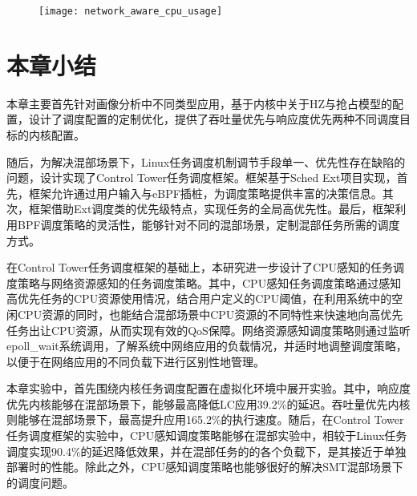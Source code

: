 \begin{figure}[H]
    \centering
    \texttt{[image: network\_aware\_cpu\_usage]}
    \label{fig:network_aware_cpu_usage}
\end{figure}


\section{本章小结}

本章主要首先针对画像分析中不同类型应用，基于内核中关于HZ与抢占模型的配置，设计了调度配置的定制优化，提供了吞吐量优先与响应度优先两种不同调度目标的内核配置。

随后，为解决混部场景下，Linux任务调度机制调节手段单一、优先性存在缺陷的问题，设计实现了Control Tower任务调度框架。框架基于Sched Ext项目实现，首先，框架允许通过用户输入与eBPF插桩，为调度策略提供丰富的决策信息。其次，框架借助Ext调度类的优先级特点，实现任务的全局高优先性。最后，框架利用BPF调度策略的灵活性，能够针对不同的混部场景，定制混部任务所需的调度方式。

在Control Tower任务调度框架的基础上，本研究进一步设计了CPU感知的任务调度策略与网络资源感知的任务调度策略。其中，CPU感知任务调度策略通过感知高优先任务的CPU资源使用情况，结合用户定义的CPU阈值，在利用系统中的空闲CPU资源的同时，也能结合混部场景中CPU资源的不同特性来快速地向高优先任务出让CPU资源，从而实现有效的QoS保障。网络资源感知调度策略则通过监听epoll\_wait系统调用，了解系统中网络应用的负载情况，并适时地调整调度策略，以便于在网络应用的不同负载下进行区别性地管理。

本章实验中，首先围绕内核任务调度配置在虚拟化环境中展开实验。其中，响应度优先内核能够在混部场景下，能够最高降低LC应用39.2\%的延迟。吞吐量优先内核则能够在混部场景下，最高提升应用165.2\%的执行速度。随后，在Control Tower任务调度框架的实验中，CPU感知调度策略能够在混部实验中，相较于Linux任务调度实现90.4\%的延迟降低效果，并在混部任务的的各个负载下，是其接近于单独部署时的性能。除此之外，CPU感知调度策略也能够很好的解决SMT混部场景下的调度问题。